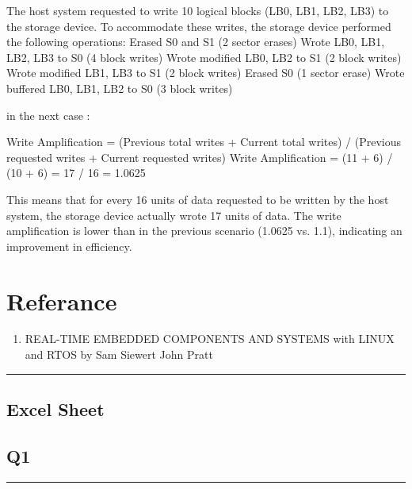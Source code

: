 \documentclass[a4paper,11pt]{article}%
\newenvironment{qanda}{\setlength{\parindent}{0pt}}{\bigskip}
\begin{document}
\begin{qanda}
The host system requested to write 10 logical blocks (LB0, LB1, LB2, LB3) to the storage device.
To accommodate these writes, the storage device performed the following operations:
Erased S0 and S1 (2 sector erases)
Wrote LB0, LB1, LB2, LB3 to S0 (4 block writes)
Wrote modified LB0, LB2 to S1 (2 block writes)
Wrote modified LB1, LB3 to S1 (2 block writes)
Erased S0 (1 sector erase)
Wrote buffered LB0, LB1, LB2 to S0 (3 block writes)

in the next case :

Write Amplification = (Previous total writes + Current total writes) / (Previous requested writes + Current requested writes)
Write Amplification = (11 + 6) / (10 + 6) = 17 / 16 = 1.0625

This means that for every 16 units of data requested to be written by the host system, the storage device actually wrote 17 units of data. The write amplification is lower than in the previous scenario (1.0625 vs. 1.1), indicating an improvement in efficiency.


\end{qanda}
\pagebreak

\section{Referance}
\begin{enumerate}
	\item REAL-TIME EMBEDDED COMPONENTS AND SYSTEMS with LINUX and RTOS by Sam Siewert John Pratt
\end{enumerate}


\vfill
\hrule
\vspace{0.5cm}

\pagebreak
\begin{appendices}
	\section{Excel Sheet}
	\subsection{Q1}
	
	\pagebreak
\end{appendices}


\vspace{1cm}
\hrule
\vspace{0.5cm}


\end{document}
